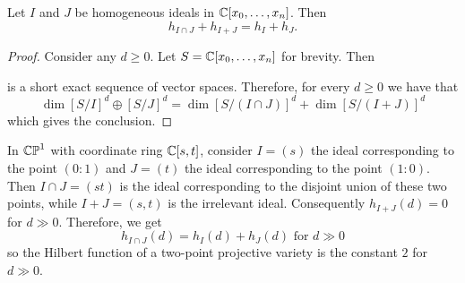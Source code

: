 \begin{proposition}
	\label{prop:hilbert_function_intersection_union}
	Let $I$ and $J$ be homogeneous ideals in $\mathbb C[x_0, \dots, x_n]$.
	Then \[ h_{I \cap J} + h_{I+J} = h_I + h_J. \]
\end{proposition}
\begin{proof}
	Consider any $d \ge 0$.
	Let $S = \mathbb C[x_0, \dots, x_n]$ for brevity.
	Then
	\begin{center}
	\end{center}
	is a short exact sequence of vector spaces.
	Therefore, for every $d \ge 0$ we have that
	\[
		\dim \left[ S / I \right]^d \oplus \left[ S / J \right]^d
		= \dim \left[ S / (I \cap J) \right]^d
		+ \dim \left[ S / (I+J) \right]^d
	\]
	which gives the conclusion.
\end{proof}
\begin{example}
	In $\mathbb{CP}^1$ with coordinate ring $\mathbb C[s,t]$,
	consider $I = (s)$ the ideal corresponding to the point $(0:1)$
	and $J = (t)$ the ideal corresponding to the point $(1:0)$.
	Then $I \cap J = (st)$ is the ideal corresponding
	to the disjoint union of these two points,
	while $I+J = (s,t)$ is the irrelevant ideal.
	Consequently $h_{I+J}(d) = 0$ for $d \gg 0$.
	Therefore, we get
	\[ h_{I \cap J}(d) = h_I(d) + h_J(d) \text{ for $d \gg 0$} \]
	so the Hilbert function of a two-point projective variety
	is the constant $2$ for $d \gg 0$.
\end{example}

